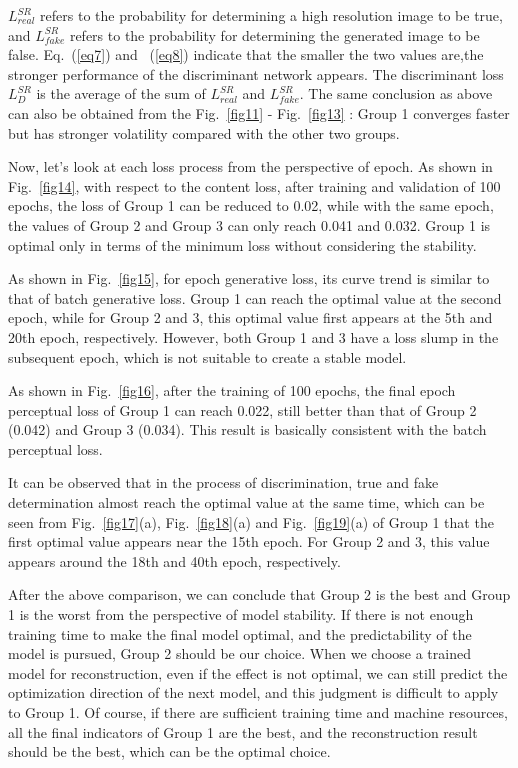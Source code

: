 \documentclass[10pt,twocolumn,letterpaper]{article}
\begin{document}
$L_{real}^{SR}$ refers to the probability for determining a high resolution image to be true, and $L_{fake}^{SR}$ refers to the probability for determining the generated image to be false. Eq.~(\ref{eq7}) and ~(\ref{eq8}) indicate that the smaller the two values are,the stronger performance of the discriminant network appears. The discriminant loss $L_{D}^{SR}$ is the average of the sum of $L_{real}^{SR}$ and $L_{fake}^{SR}$. The same conclusion as above can also be obtained from the Fig.~\ref{fig11} - Fig.~\ref{fig13} : Group 1 converges faster but has stronger volatility compared with the other two groups.
 
Now, let's look at each loss process from the perspective of epoch. As shown in Fig.~\ref{fig14}, with respect to the content loss, after training and validation of 100 epochs, the loss of Group 1 can be reduced to 0.02, while with the same epoch, the values of Group 2 and Group 3 can only reach 0.041 and 0.032. Group 1 is optimal only in terms of the minimum loss without considering the stability.

 As shown in Fig.~\ref{fig15}, for epoch generative loss, its curve trend is similar to that of batch generative loss. Group 1 can reach the optimal value at the second epoch, while for Group 2 and 3, this optimal value first appears at the 5th and 20th epoch, respectively. However, both Group 1 and 3 have a loss slump in the subsequent epoch, which is not suitable to create a stable model.
 
As shown in Fig.~\ref{fig16}, after the training of 100 epochs, the final epoch perceptual loss of Group 1 can reach 0.022, still better than that of Group 2 (0.042) and Group 3 (0.034). This result is basically consistent with the batch perceptual loss.

It can be observed that in the process of discrimination, true and fake determination almost reach the optimal value at the same time, which can be seen from Fig.~\ref{fig17}(a), Fig.~\ref{fig18}(a) and Fig.~\ref{fig19}(a) of Group 1 that the first optimal value appears near the 15th epoch. For Group 2 and 3, this value appears around the 18th and 40th epoch, respectively.

After the above comparison, we can conclude that Group 2 is the best and Group 1 is the worst from the perspective of model stability. If there is not enough training time to make the final model optimal, and the predictability of the model is pursued, Group 2 should be our choice. When we choose a trained model for reconstruction, even if the effect is not optimal, we can still predict the optimization direction of the next model, and this judgment is difficult to apply to Group 1. Of course, if there are sufficient training time and machine resources, all the final indicators of Group 1 are the best, and the reconstruction result should be the best, which can be the optimal choice.
\end{document}
